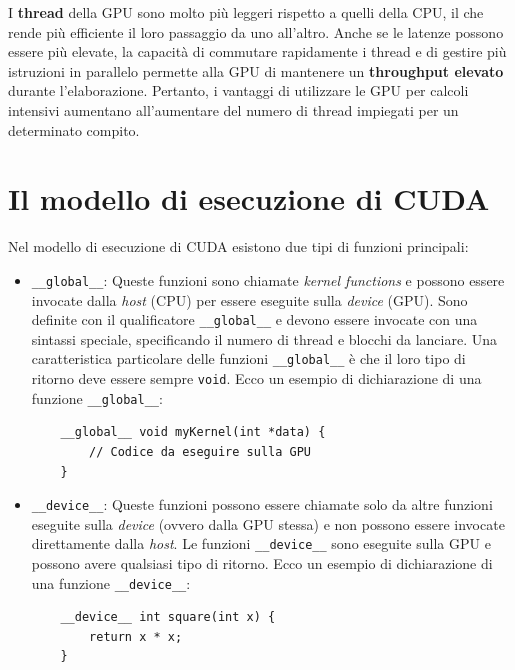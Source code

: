 \documentclass[12pt,a4paper]{report}
\begin{document}
I \textbf{thread} della GPU sono molto più leggeri rispetto a quelli della CPU, il che rende più efficiente il loro passaggio da uno all'altro. Anche se le latenze possono essere più elevate, la capacità di commutare rapidamente i thread e di gestire più istruzioni in parallelo permette alla GPU di mantenere un \textbf{throughput elevato} durante l'elaborazione. Pertanto, i vantaggi di utilizzare le GPU per calcoli intensivi aumentano all'aumentare del numero di thread impiegati per un determinato compito.

\section{Il modello di esecuzione di CUDA}

Nel modello di esecuzione di CUDA esistono due tipi di funzioni principali:

\begin{itemize}
    \item \texttt{\_\_global\_\_}: Queste funzioni sono chiamate \textit{kernel functions} e possono essere invocate dalla \textit{host} (CPU) per essere eseguite sulla \textit{device} (GPU). Sono definite con il qualificatore \texttt{\_\_global\_\_} e devono essere invocate con una sintassi speciale, specificando il numero di thread e blocchi da lanciare. Una caratteristica particolare delle funzioni \texttt{\_\_global\_\_} è che il loro tipo di ritorno deve essere sempre \texttt{void}. Ecco un esempio di dichiarazione di una funzione \texttt{\_\_global\_\_}:

    \begin{lstlisting}
    __global__ void myKernel(int *data) {
        // Codice da eseguire sulla GPU
    }
    \end{lstlisting}

    \item \texttt{\_\_device\_\_}: Queste funzioni possono essere chiamate solo da altre funzioni eseguite sulla \textit{device} (ovvero dalla GPU stessa) e non possono essere invocate direttamente dalla \textit{host}. Le funzioni \texttt{\_\_device\_\_} sono eseguite sulla GPU e possono avere qualsiasi tipo di ritorno. Ecco un esempio di dichiarazione di una funzione \texttt{\_\_device\_\_}:

    \begin{lstlisting}
    __device__ int square(int x) {
        return x * x;
    }
    \end{lstlisting}
\end{itemize}
\end{document}
